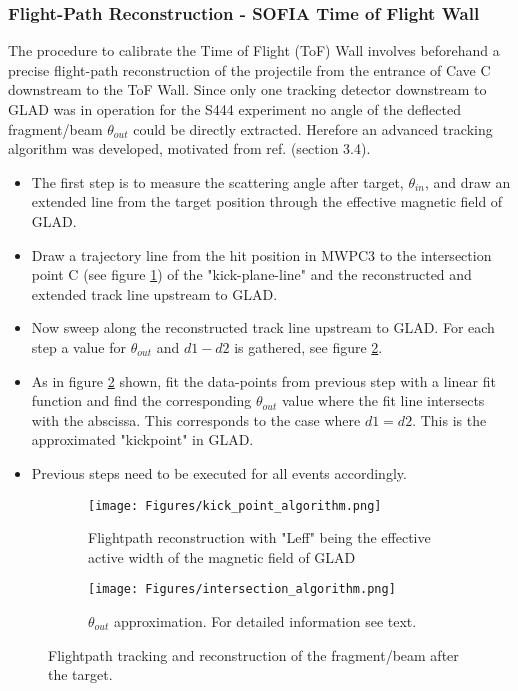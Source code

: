 \subsubsection{Flight-Path Reconstruction - SOFIA Time of Flight Wall}\label{subsec:flightpath_reco}
The procedure to calibrate the Time of Flight (ToF) Wall involves beforehand a precise flight-path reconstruction of the projectile from the entrance of Cave C downstream to the ToF Wall. Since only one tracking detector downstream to GLAD was in operation for the S444 experiment no angle of the deflected fragment/beam $\theta_{out}$ could be directly extracted. Herefore an advanced tracking algorithm was developed, motivated from ref. \cite{bertini2013study} (section 3.4). 
\begin{itemize}
\item The first step is to measure the scattering angle after target, $\theta_{in}$, and draw an extended line from the target position through the effective magnetic field of GLAD.  
\item Draw a trajectory line from the hit position in MWPC3 to the intersection point C (see figure \ref{fig:sub1_reco_path}) of the "kick-plane-line" and the reconstructed and extended track line upstream to GLAD.
\item Now sweep along the reconstructed track line upstream to GLAD. For each step a value for $\theta_{out}$ and $d1-d2$ is gathered, see figure \ref{fig:sub2_reco_path}.
\item As in figure \ref{fig:sub2_reco_path} shown, fit the data-points from previous step with a linear fit function and find the corresponding $\theta_{out}$ value where the fit line intersects with the abscissa. This corresponds to the case where $d1 = d2$. This is the approximated "kickpoint" in GLAD. 
\item Previous steps need to be executed for all events accordingly.
\end{itemize}
\begin{figure}[ht]
    \centering
    \begin{subfigure}[b]{0.70\textwidth}
        \texttt{[image: Figures/kick\_point\_algorithm.png]}
        \caption{Flightpath reconstruction with "Leff" being the effective active width of the magnetic field of GLAD}
        \label{fig:sub1_reco_path}
    \end{subfigure}
    \begin{subfigure}[b]{0.25\textwidth}
        \texttt{[image: Figures/intersection\_algorithm.png]}
        \caption{$\theta_{out}$ approximation. For detailed information see text.}
        \label{fig:sub2_reco_path}
    \end{subfigure}

    \caption{Flightpath tracking and reconstruction of the fragment/beam after the target.}
    \label{fig:reco_path}
\end{figure}


